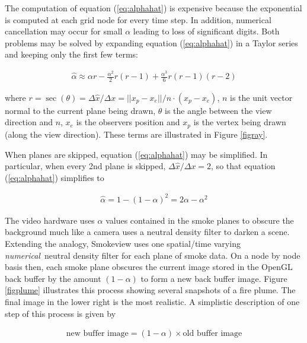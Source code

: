 The computation of equation (\ref{eq:alphahat}) is expensive because the exponential is computed at each grid node for every time step.  In addition, numerical cancellation may occur for small $\alpha$ leading to loss of significant digits. Both problems may be solved by expanding equation (\ref{eq:alphahat}) in a Taylor series and keeping only the first few terms:

\begin{eqnarray*}
\hat{\alpha}\approx \alpha r -
\frac{\alpha^2}{2}r(r-1)+\frac{\alpha^3}{6}r(r-1)(r-2)
\end{eqnarray*}

where $r=\sec(\theta)=\Delta \hat{x}/\Delta x=||x_p-x_e||/n\cdot(x_p-x_e)$, $n$ is the unit vector normal to the current plane being drawn, $\theta$ is the angle between the view direction and $n$, $x_e$ is the observers position and $x_p$ is the vertex being drawn (along the view direction).  These terms are illustrated in Figure \ref{figray}.

When planes are skipped, equation (\ref{eq:alphahat}) may be simplified.  In particular, when every 2nd plane is skipped, $\Delta\hat{x}/\Delta x=2$, so that equation (\ref{eq:alphahat})
simplifies to

\begin{eqnarray*}
\hat{\alpha}=1-(1-\alpha)^2=2\alpha-\alpha^2
\end{eqnarray*}

The video hardware uses $\alpha$ values contained in the smoke planes to obscure the background much like a camera uses a neutral density filter to darken a scene.  Extending the analogy, Smokeview uses one spatial/time varying {\em numerical}\ neutral density filter for each plane of smoke data.  On a node by node basis then, each smoke plane obscures the current image stored in  the OpenGL back buffer by the amount $(1-\alpha)$ to form a new back buffer image.  Figure \ref{figplume} illustrates this process showing several snapshots of a fire plume. The final image in the lower right is the most realistic. A simplistic description of one step of this process is given by

\begin{eqnarray*}
\mbox{new buffer image} = (1-\alpha)\times \mbox{old buffer image}
\end{eqnarray*}


